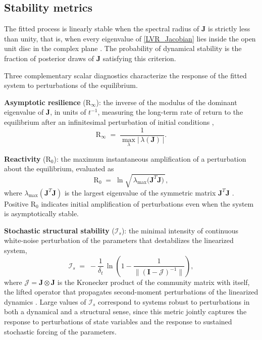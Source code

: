 \documentclass[12pt]{article}
\begin{document}
\subsection{Stability metrics}

The fitted process is linearly stable when the spectral radius of $\mathbf{J}$ is strictly less than unity, that is, when every eigenvalue of \eqref{LVR_Jacobian} lies inside the open unit disc in the complex plane \citep{Elaydi2005}. The probability of dynamical stability is the fraction of posterior draws of $\mathbf{J}$ satisfying this criterion.

Three complementary scalar diagnostics characterize the response of the fitted system to perturbations of the equilibrium.

\noindent\textbf{Asymptotic resilience} ($\mathrm{R}_{\infty}$): the inverse of the modulus of the dominant eigenvalue of $\mathbf{J}$, in units of $t^{-1}$, measuring the long-term rate of return to the equilibrium after an infinitesimal perturbation of initial conditions \citep{Ives1995,Ives2003,Arnoldi2016a},
\begin{equation}\label{ResilienceLVR}
	\mathrm{R}_{\infty} \;=\; \frac{1}{\max_{\lambda}\bigl|\,\lambda(\mathbf{J})\,\bigr|}.
\end{equation}

\noindent\textbf{Reactivity} ($\mathrm{R}_{0}$): the maximum instantaneous amplification of a perturbation about the equilibrium, evaluated as
\begin{equation}\label{ReactivityLVR}
	\mathrm{R}_{0} \;=\; \ln\!\sqrt{\,\lambda_{\max}\!\bigl(\mathbf{J}^{T}\mathbf{J}\bigr)\,},
\end{equation}
where $\lambda_{\max}(\mathbf{J}^{T}\mathbf{J})$ is the largest eigenvalue of the symmetric matrix $\mathbf{J}^{T}\mathbf{J}$ \citep{Ives2003,Caswell2005,Snyder2010a}. Positive $\mathrm{R}_{0}$ indicates initial amplification of perturbations even when the system is asymptotically stable.

\noindent\textbf{Stochastic structural stability} ($\mathcal{I}_{s}$): the minimal intensity of continuous white-noise perturbation of the parameters that destabilizes the linearized system,
\begin{equation}\label{SSS_LVR}
	\mathcal{I}_{s} \;=\; -\frac{1}{\delta_{t}}\,\ln\!\left(1 - \frac{1}{\bigl\lVert(\mathbf{I}-\mathcal{J})^{-1}\bigr\rVert}\right),
\end{equation}
where $\mathcal{J}=\mathbf{J}\otimes\mathbf{J}$ is the Kronecker product of the community matrix with itself, the lifted operator that propagates second-moment perturbations of the linearized dynamics \citep{Arnoldi2016a,Arnoldi2016b}. Large values of $\mathcal{I}_{s}$ correspond to systems robust to perturbations in both a dynamical and a structural sense, since this metric jointly captures the response to perturbations of state variables and the response to sustained stochastic forcing of the parameters.
\end{document}
